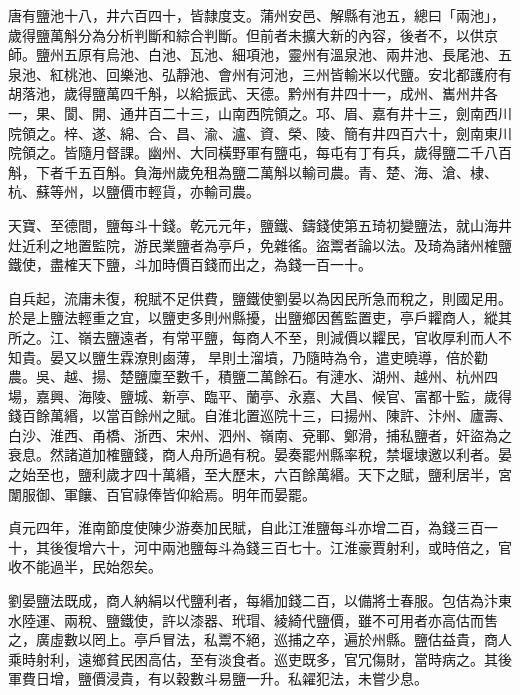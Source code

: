 
\begin{pinyinscope}

 唐有鹽池十八，井六百四十，皆隸度支。蒲州安邑、解縣有池五，總曰「兩池」，歲得鹽萬斛分為分析判斷和綜合判斷。但前者未擴大新的內容，後者不，以供京師。鹽州五原有烏池、白池、瓦池、細項池，靈州有溫泉池、兩井池、長尾池、五泉池、紅桃池、回樂池、弘靜池、會州有河池，三州皆輸米以代鹽。安北都護府有胡落池，歲得鹽萬四千斛，以給振武、天德。黔州有井四十一，成州、巂州井各一，果、閬、開、通井百二十三，山南西院領之。邛、眉、嘉有井十三，劍南西川院領之。梓、遂、綿、合、昌、渝、瀘、資、榮、陵、簡有井四百六十，劍南東川院領之。皆隨月督課。幽州、大同橫野軍有鹽屯，每屯有丁有兵，歲得鹽二千八百斛，下者千五百斛。負海州歲免租為鹽二萬斛以輸司農。青、楚、海、滄、棣、杭、蘇等州，以鹽價市輕貨，亦輸司農。



 天寶、至德間，鹽每斗十錢。乾元元年，鹽鐵、鑄錢使第五琦初變鹽法，就山海井灶近利之地置監院，游民業鹽者為亭戶，免雜徭。盜鬻者論以法。及琦為諸州榷鹽鐵使，盡榷天下鹽，斗加時價百錢而出之，為錢一百一十。



 自兵起，流庸未復，稅賦不足供費，鹽鐵使劉晏以為因民所急而稅之，則國足用。於是上鹽法輕重之宜，以鹽吏多則州縣擾，出鹽鄉因舊監置吏，亭戶糶商人，縱其所之。江、嶺去鹽遠者，有常平鹽，每商人不至，則減價以糶民，官收厚利而人不知貴。晏又以鹽生霖潦則鹵薄，旱則土溜墳，乃隨時為令，遣吏曉導，倍於勸農。吳、越、揚、楚鹽廩至數千，積鹽二萬餘石。有漣水、湖州、越州、杭州四場，嘉興、海陵、鹽城、新亭、臨平、蘭亭、永嘉、大昌、候官、富都十監，歲得錢百餘萬緡，以當百餘州之賦。自淮北置巡院十三，曰揚州、陳許、汴州、廬壽、白沙、淮西、甬橋、浙西、宋州、泗州、嶺南、兗鄆、鄭滑，捕私鹽者，奸盜為之衰息。然諸道加榷鹽錢，商人舟所過有稅。晏奏罷州縣率稅，禁堰埭邀以利者。晏之始至也，鹽利歲才四十萬緡，至大歷末，六百餘萬緡。天下之賦，鹽利居半，宮闈服御、軍饟、百官祿俸皆仰給焉。明年而晏罷。



 貞元四年，淮南節度使陳少游奏加民賦，自此江淮鹽每斗亦增二百，為錢三百一十，其後復增六十，河中兩池鹽每斗為錢三百七十。江淮豪賈射利，或時倍之，官收不能過半，民始怨矣。



 劉晏鹽法既成，商人納絹以代鹽利者，每緡加錢二百，以備將士春服。包佶為汴東水陸運、兩稅、鹽鐵使，許以漆器、玳瑁、綾綺代鹽價，雖不可用者亦高估而售之，廣虛數以罔上。亭戶冒法，私鬻不絕，巡捕之卒，遍於州縣。鹽估益貴，商人乘時射利，遠鄉貧民困高估，至有淡食者。巡吏既多，官冗傷財，當時病之。其後軍費日增，鹽價浸貴，有以穀數斗易鹽一升。私糴犯法，未嘗少息。




\end{pinyinscope}
